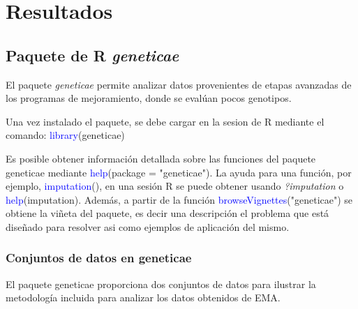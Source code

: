 \chapter{Resultados}
\section{Paquete de R \emph{geneticae}}

El paquete \emph{geneticae} permite analizar datos provenientes de etapas avanzadas de los programas de mejoramiento, donde se evalúan pocos genotipos. 

Una vez instalado el paquete, se debe cargar en la sesion de R mediante el comando: \textcolor{blue}{library}(geneticae)

Es posible obtener información detallada sobre las funciones del paquete geneticae mediante \textcolor{blue}{help}(package = "geneticae").  La ayuda para una función, por ejemplo, \textcolor{blue}{imputation}(), en una sesión R se puede obtener usando \emph{?imputation} o \textcolor{blue}{help}(imputation). Además, a partir de la función \textcolor{blue}{browseVignettes}("geneticae") se obtiene la viñeta del paquete, es decir una descripción el problema que está diseñado para resolver asi como ejemplos de aplicación del mismo.


\subsection{Conjuntos de datos en geneticae}

El paquete geneticae proporciona dos conjuntos de datos para ilustrar la metodología incluida para analizar los datos obtenidos de EMA.

